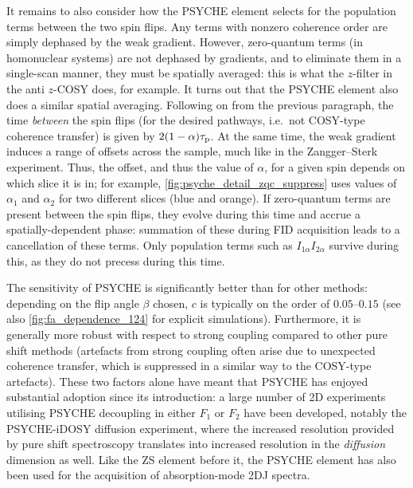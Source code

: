 It remains to also consider how the PSYCHE element selects for the population terms between the two spin flips.
Any terms with nonzero coherence order are simply dephased by the weak gradient.
However, zero-quantum terms (in homonuclear systems) are not dephased by gradients, and to eliminate them in a single-scan manner, they must be spatially averaged: this is what the $z$-filter in the anti $z$-COSY does, for example.
It turns out that the PSYCHE element also does a similar spatial averaging.
Following on from the previous paragraph, the time \textit{between} the spin flips (for the desired pathways, i.e.\ not COSY-type coherence transfer) is given by $2(1 - \alpha)\tau_\mathrm{p}$.
At the same time, the weak gradient induces a range of offsets across the sample, much like in the Zangger--Sterk experiment.
Thus, the offset, and thus the value of $\alpha$, for a given spin depends on which slice it is in; for example, \cref{fig:psyche_detail_zqc_suppress} uses values of $\alpha_1$ and $\alpha_2$ for two different slices (blue and orange).
If zero-quantum terms are present between the spin flips, they evolve during this time and accrue a spatially-dependent phase: summation of these during FID acquisition leads to a cancellation of these terms.
Only population terms such as $I_{1\alpha}I_{2\alpha}$ survive during this, as they do not precess during this time.

The sensitivity of PSYCHE is significantly better than for other methods: depending on the flip angle $\beta$ chosen, $c$ is typically on the order of $0.05$--$0.15$ (see also \cref{fig:fa_dependence_124} for explicit simulations).
Furthermore, it is generally more robust with respect to strong coupling compared to other pure shift methods (artefacts from strong coupling often arise due to unexpected coherence transfer\autocite{Thrippleton2005JMR}, which is suppressed in a similar way to the COSY-type artefacts).
These two factors alone have meant that PSYCHE has enjoyed substantial adoption since its introduction: a large number of 2D experiments utilising PSYCHE decoupling in either $F_1$ or $F_2$ have been developed,\autocite{Foroozandeh2014JACS,Timari2015CEJ,Koos2016ACIE,Sinnaeve2016ACIE,Aguilar2018MRC,Kaltschnee2016JMR,Ilgen2021JMR} notably the PSYCHE-iDOSY diffusion experiment\autocite{Foroozandeh2016ACIE}, where the increased resolution provided by pure shift spectroscopy translates into increased resolution in the \textit{diffusion} dimension as well.
Like the ZS element before it, the PSYCHE element has also been used for the acquisition of absorption-mode 2DJ spectra.\autocite{Foroozandeh2015CC}


